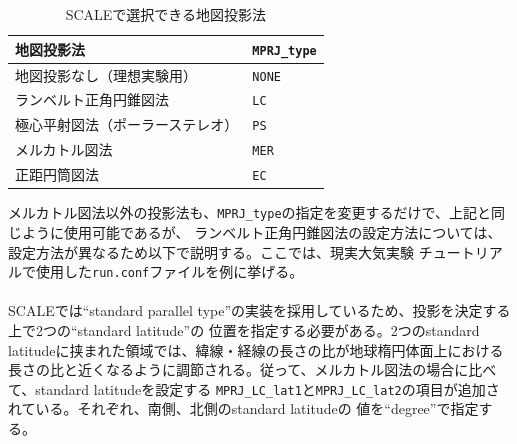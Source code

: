\begin{table}[htb]
\begin{center}
\caption{SCALEで選択できる地図投影法}
\begin{tabularx}{150mm}{|l|X|} \hline
 \rowcolor[gray]{0.9} 地図投影法 & \verb|MPRJ_type| \\ \hline
 地図投影なし（理想実験用）& \verb|NONE| \\ \hline
 ランベルト正角円錐図法 & \verb|LC| \\ \hline
 極心平射図法（ポーラーステレオ） & \verb|PS| \\ \hline
 メルカトル図法 & \verb|MER| \\ \hline
 正距円筒図法 & \verb|EC| \\ \hline
\end{tabularx}
\label{tab:map_proj}
\end{center}
\end{table}

メルカトル図法以外の投影法も、\verb|MPRJ_type|の指定を変更するだけで、上記と同じように使用可能であるが、
ランベルト正角円錐図法の設定方法については、設定方法が異なるため以下で説明する。ここでは、現実大気実験
チュートリアルで使用した\verb|run.conf|ファイルを例に挙げる。\\

\\

SCALEでは``standard parallel type''の実装を採用しているため、投影を決定する上で2つの``standard latitude''の
位置を指定する必要がある。2つのstandard latitudeに挟まれた領域では、緯線・経線の長さの比が地球楕円体面上における
長さの比と近くなるように調節される。従って、メルカトル図法の場合に比べて、standard latitudeを設定する
\verb|MPRJ_LC_lat1|と\verb|MPRJ_LC_lat2|の項目が追加されている。それぞれ、南側、北側のstandard latitudeの
値を``degree''で指定する。

